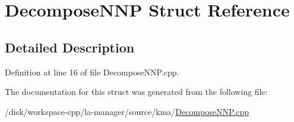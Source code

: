 \hypertarget{structDecomposeNNP}{
\section{DecomposeNNP Struct Reference}
\label{structDecomposeNNP}
}


\subsection{Detailed Description}


Definition at line 16 of file DecomposeNNP.cpp.

The documentation for this struct was generated from the following file:\begin{CompactItemize}
\item 
/disk/workspace-cpp/la-manager/source/kma/\hyperlink{DecomposeNNP_8cpp}{DecomposeNNP.cpp}\end{CompactItemize}
